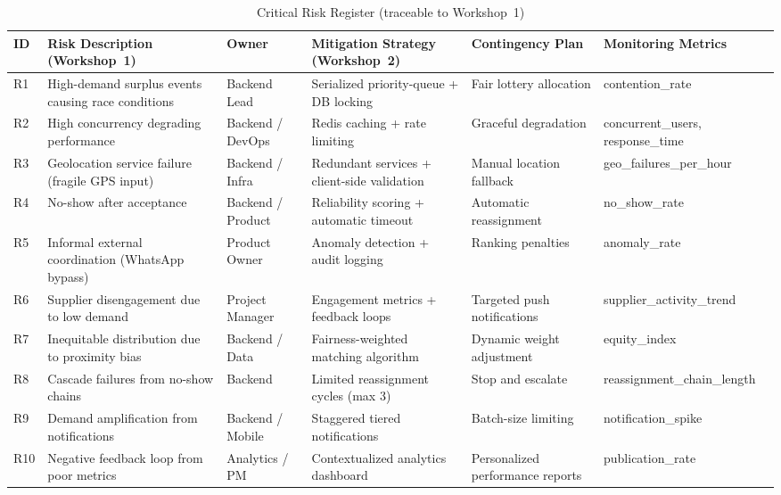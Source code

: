 \documentclass[9pt,conference]{IEEEtran}
\begin{document}
\begin{table}[htbp]
\centering
\small
\begin{threeparttable}
\caption{Critical Risk Register (traceable to Workshop~1)}
\label{tab:critical-risk-register}
\begin{tabularx}{\textwidth}{@{} l X l X X X @{}}
\toprule
\textbf{ID} & \textbf{Risk Description (Workshop~1)} & \textbf{Owner} & \textbf{Mitigation Strategy (Workshop~2)} & \textbf{Contingency Plan} & \textbf{Monitoring Metrics} \\
\midrule
R1  & High-demand surplus events causing race conditions          & Backend Lead      & Serialized priority-queue + DB locking             & Fair lottery allocation       & contention\_rate \\
R2  & High concurrency degrading performance                      & Backend / DevOps  & Redis caching + rate limiting                      & Graceful degradation          & concurrent\_users, response\_time \\
R3  & Geolocation service failure (fragile GPS input)             & Backend / Infra   & Redundant services + client-side validation        & Manual location fallback      & geo\_failures\_per\_hour \\
R4  & No-show after acceptance                                    & Backend / Product & Reliability scoring + automatic timeout            & Automatic reassignment        & no\_show\_rate \\
R5  & Informal external coordination (WhatsApp bypass)            & Product Owner     & Anomaly detection + audit logging                  & Ranking penalties             & anomaly\_rate \\
R6  & Supplier disengagement due to low demand                    & Project Manager   & Engagement metrics + feedback loops                & Targeted push notifications   & supplier\_activity\_trend \\
R7  & Inequitable distribution due to proximity bias              & Backend / Data    & Fairness-weighted matching algorithm               & Dynamic weight adjustment     & equity\_index \\
R8  & Cascade failures from no-show chains                        & Backend           & Limited reassignment cycles (max 3)                & Stop and escalate             & reassignment\_chain\_length \\
R9  & Demand amplification from notifications                     & Backend / Mobile  & Staggered tiered notifications                     & Batch-size limiting           & notification\_spike \\
R10 & Negative feedback loop from poor metrics                    & Analytics / PM    & Contextualized analytics dashboard                 & Personalized performance reports & publication\_rate \\
\bottomrule
\end{tabularx}
\end{threeparttable}
\end{table}
\end{document}
